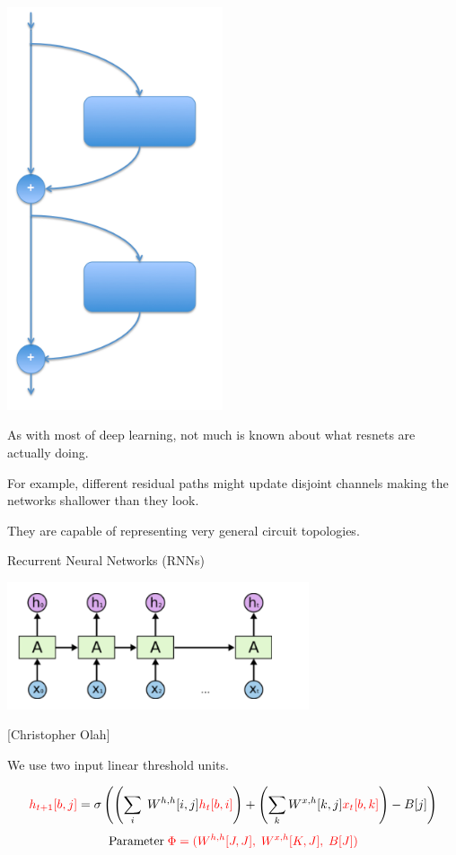 {\vfill
\includegraphics[width= 2.5in]{../images/resnet}
\hfill \begin{minipage}[b]{4in} As with most of deep learning, not much is known about what resnets are actually doing.
  
  \bigskip
  \bigskip
  For example, different residual paths might update disjoint channels making the networks shallower than they look.

  \bigskip
  \bigskip
  They are capable of representing very general circuit topologies.
\end{minipage}

\slideplain{}
\vfill
\centerline{Recurrent Neural Networks (RNNs)}
\vfill
\vfill




\centerline{\includegraphics[width=3.5in]{../images/RNN}}
\centerline{{\large [Christopher Olah]}}

We use two input linear threshold units.

{\huge
$${\color{red} h_{t+1}[b,j]} = \sigma\left(\left(\sum_i\;W^{h,h}[i,j]{\color{red} h_t[b,i]}\right) + \left(\sum_k W^{x,h}[k,j]{\color{red} x_t[b,k]}\right) - B[j]\right)$$
}
\vfill
$$\mathrm{Parameter}\;{\color{red} \Phi = (W^{h,h}[J,J],\;W^{x,h}[K,J],\;B[J])}$$


}
